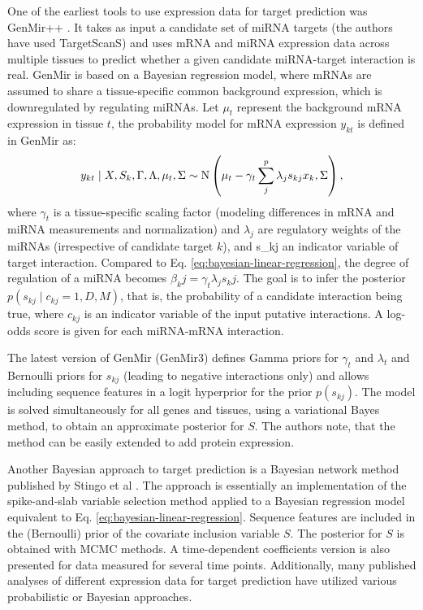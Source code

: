 One of the earliest tools to use expression data for target prediction was
GenMir++ \citep{Huang2007}. It takes as input a candidate set of miRNA targets (the authors
have used TargetScanS) and uses mRNA and miRNA expression data across multiple tissues
to predict whether a given candidate miRNA-target interaction is real.
GenMir is based on a Bayesian regression model, where
mRNAs are assumed to share a tissue-specific common background expression,
which is downregulated by regulating miRNAs. Let $\mu_t$ represent the
background mRNA expression in tissue $t$, the probability model for
mRNA expression $y_{kt}$ is defined in GenMir as:
\begin{equation}
  y_{kt} \mid X, S_k, \Gamma, \Lambda, \mu_t, \Sigma \sim \textup{N} \left( \mu_t - \gamma_t \sum_j^p \lambda_j s_{kj} x_k, \Sigma \right),
\end{equation}
where $\gamma_t$ is a tissue-specific scaling factor (modeling differences in
mRNA and miRNA measurements and normalization) and $\lambda_j$ are regulatory
weights of the miRNAs (irrespective of candidate target $k$), and s_{kj} an
indicator variable of target interaction. Compared to Eq.
\eqref{eq:bayesian-linear-regression}, the degree of regulation of a miRNA becomes $\beta_kj =
\gamma_t \lambda_j s_kj$. The goal is to infer the posterior
$p(s_{kj} \mid c_{kj} = 1, D, M)$, that is, the probability of a candidate interaction being true,
where $c_{kj}$ is an indicator variable of the input putative interactions.
A log-odds score is given for each miRNA-mRNA interaction.

The latest version of GenMir (GenMir3) defines Gamma priors for $\gamma_t$ and
$\lambda_t$ and Bernoulli priors for $s_{kj}$ (leading to negative
interactions only) and allows including sequence features in a logit
hyperprior for the prior $p(s_{kj})$. The model is solved simultaneously for
all genes and tissues, using a variational Bayes method, to obtain an
approximate posterior for $S$. The authors note, that the method can be easily
extended to add protein expression.

Another Bayesian approach to target prediction is a Bayesian network method published by Stingo et al
\citep{Stingo2010}. The approach is essentially an implementation of the spike-and-slab variable
selection method \citep{Vehtari2012} applied to a Bayesian regression model
equivalent to Eq. \eqref{eq:bayesian-linear-regression}. Sequence features are
included in the (Bernoulli) prior of the covariate inclusion variable $S$. The
posterior for $S$ is obtained with MCMC methods. A time-dependent coefficients version
is also presented for data measured for several time points.
Additionally, many published analyses of different expression data for target prediction
have utilized various probabilistic or Bayesian approaches.
